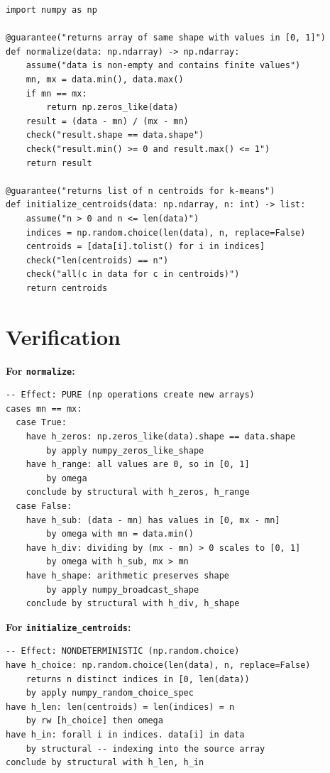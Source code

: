 \documentclass[11pt,a4paper]{report}
\theoremstyle{definition}
\theoremstyle{plain}
\begin{document}
\begin{lstlisting}[style=synhopy]
import numpy as np

@guarantee("returns array of same shape with values in [0, 1]")
def normalize(data: np.ndarray) -> np.ndarray:
    assume("data is non-empty and contains finite values")
    mn, mx = data.min(), data.max()
    if mn == mx:
        return np.zeros_like(data)
    result = (data - mn) / (mx - mn)
    check("result.shape == data.shape")
    check("result.min() >= 0 and result.max() <= 1")
    return result

@guarantee("returns list of n centroids for k-means")
def initialize_centroids(data: np.ndarray, n: int) -> list:
    assume("n > 0 and n <= len(data)")
    indices = np.random.choice(len(data), n, replace=False)
    centroids = [data[i].tolist() for i in indices]
    check("len(centroids) == n")
    check("all(c in data for c in centroids)")
    return centroids
\end{lstlisting}

\section{Verification}

\textbf{For \texttt{normalize}:}
\begin{lstlisting}[style=proof]
-- Effect: PURE (np operations create new arrays)
cases mn == mx:
  case True:
    have h_zeros: np.zeros_like(data).shape == data.shape
        by apply numpy_zeros_like_shape
    have h_range: all values are 0, so in [0, 1]
        by omega
    conclude by structural with h_zeros, h_range
  case False:
    have h_sub: (data - mn) has values in [0, mx - mn]
        by omega with mn = data.min()
    have h_div: dividing by (mx - mn) > 0 scales to [0, 1]
        by omega with h_sub, mx > mn
    have h_shape: arithmetic preserves shape
        by apply numpy_broadcast_shape
    conclude by structural with h_div, h_shape
\end{lstlisting}

\textbf{For \texttt{initialize\_centroids}:}
\begin{lstlisting}[style=proof]
-- Effect: NONDETERMINISTIC (np.random.choice)
have h_choice: np.random.choice(len(data), n, replace=False)
    returns n distinct indices in [0, len(data))
    by apply numpy_random_choice_spec
have h_len: len(centroids) = len(indices) = n
    by rw [h_choice] then omega
have h_in: forall i in indices. data[i] in data
    by structural -- indexing into the source array
conclude by structural with h_len, h_in
\end{lstlisting}
\end{document}
